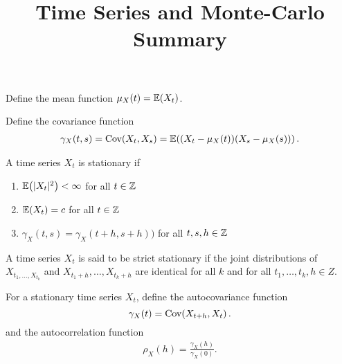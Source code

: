 

\title{Time Series and Monte-Carlo Summary}



\maketitle

\begin{defn}
  \label{defn:time_series:7}
  Define the mean function $\mu_{X}(t) = \E{X_{t}}$.

  Define the covariance function
  \begin{align}
    \gamma_{X}(t, s) = \Cov{X_{t}}{X_{s}} = \E{(X_{t} -
      \mu_{X}(t))(X_{s} - \mu_{X}(s))}.\label{eq:11}
  \end{align}
\end{defn}

\begin{defn}
  \label{defn:time_series:6}
  A time series $X_{t}$ is stationary if
  \begin{enumerate}
  \item $\E{|X_t|^2} < \infty$ for all $t \in \mathbb{Z}$
  \item $\E{X_{t}} = c$ for all $t \in \mathbb{Z}$
  \item $\gamma_{X}(t, s) = \gamma_{X}(t+h, s+h))$ for all $t, s, h
    \in \mathbb{Z}$
  \end{enumerate}
\end{defn}

\begin{defn}
  \label{defn:time_series:8}
  A time series $X_{t}$ is said to be strict stationary if the joint
  distributions of $X_{t_{1}, \dots, X_{t_{k}}}$ and $X_{t_{1} + h},
  \dots, X_{t_{k} + h}$ are identical for all $k$ and for all $t_{1},
  \dots, t_{k}, h \in Z$.
\end{defn}

\begin{defn}
  \label{defn:time_series:9}
  For a stationary time series $X_{t}$, define the autocovariance
  function
  \begin{equation}
    \label{eq:2}
    \gamma_{X}(t) = \Cov{X_{t+h}}{X_{t}}.
  \end{equation}
  and the autocorrelation function
  \begin{align}
    \label{eq:3}
    \rho_{X}(h) = \frac{\gamma_{X}(h)}{\gamma_{X}(0)}.
  \end{align}
\end{defn}

